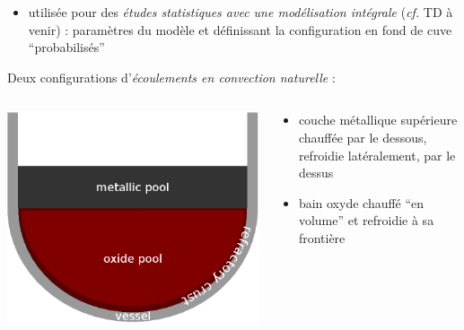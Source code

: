 \begin{frame}[fragile]
\begin{itemize}
\begin{columns}[T]
\begin{column}{0.65\textwidth}
\begin{itemize}
    \item masses et compositions de ces deux couches obtenus à partir de simulations de la dégradation en c\oe ur et d'hypothèses simplistes sur la fusion des structures et de la paroi de la cuve
    \end{itemize}
    \end{column}
\end{columns}
  \item utilisée pour des \emph{études statistiques avec une modélisation intégrale} (\textit{cf.} TD à venir) : paramètres du modèle et définissant la configuration en fond de cuve ``probabilisés'' 
\end{itemize}

\end{frame}
\begin{frame}[fragile]
Deux configurations d'\emph{écoulements en convection naturelle} :
\begin{columns}[T]
    \begin{column}{0.3\textwidth}
\centering \includegraphics[height=0.3\textheight]{Figures/TD_2layer_2.eps}
    \end{column}
    \begin{column}{0.7\textwidth}
    \begin{itemize}
    \item couche métallique supérieure chauffée par le dessous, refroidie latéralement, par le dessus
    \item bain oxyde chauffé ``en volume'' et refroidie à sa frontière

\end{itemize}
\end{column}
\end{columns}
\end{frame}
